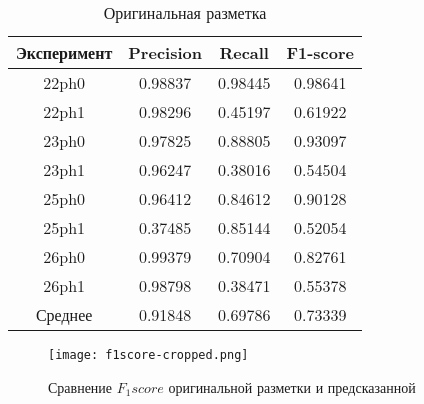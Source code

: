 \begin{table}[!htb]
	\centering
	\caption{Оригинальная разметка}
	\label{tab:original}
	\begin{tabular}{@{}cccc@{}}
		\toprule
		\textbf{Эксперимент} & \textbf{Precision} & \textbf{Recall} & \textbf{F1-score} \\ \midrule
		22ph0                & 0.98837            & 0.98445         & 0.98641           \\
		22ph1                & 0.98296            & 0.45197         & 0.61922           \\
		23ph0                & 0.97825            & 0.88805         & 0.93097           \\
		23ph1                & 0.96247            & 0.38016         & 0.54504           \\
		25ph0                & 0.96412            & 0.84612         & 0.90128           \\
		25ph1                & 0.37485            & 0.85144         & 0.52054           \\
		26ph0                & 0.99379            & 0.70904         & 0.82761           \\
		26ph1                & 0.98798            & 0.38471         & 0.55378           \\ \midrule
		Среднее              & 0.91848            & 0.69786         & 0.73339           \\ \bottomrule
	\end{tabular}
\end{table}

\begin{figure}[!htb]
	\centering
	\caption{Сравнение $F_1score$ оригинальной разметки и предсказанной}
	\texttt{[image: f1score-cropped.png]}
	\label{fig:f1score-vs}
\end{figure}
